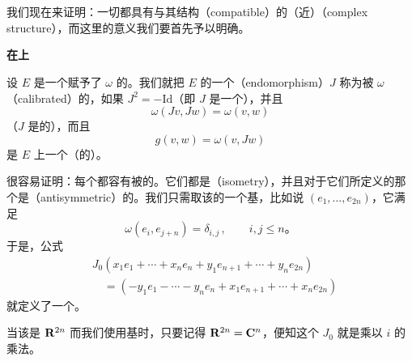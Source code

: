 
\section{\trComplexStructure}
\label{sec:complex-structures}

我们现在来证明：一切\trSymplectic{}\trManifold{}都具有与其\trSymplectic{}结构\textbf{\trCompatible}（compatible）的（近）\textbf{\trComplexStructure}（complex structure），而这里\trCompatible{}的意义我们要首先予以明确。

\textbf{在\trVectorSpace{}上}

设 $E$ 是一个赋予了\trSymplecticForm{} $\omega$ 的\trVectorSpace。我们就把 $E$ 的一个\textbf{\trEndomorphism}（endomorphism）$J$ 称为被 $\omega$ \textbf{\trCalibrated}（calibrated）的\trComplexStructure，如果 $J^2=-\mathrm{Id}$（即 $J$ 是一个\trComplexStructure），并且
\[
\omega(Jv,Jw)=\omega(v,w)
\]
（$J$ 是\trSymplectic{}的），而且
\[
g(v,w)=\omega(v,Jw)
\]
是 $E$ 上一个（\trPositiveDefinite{}的）\trInnerProduct。

很容易证明：每个\trSymplectic{}\trVectorSpace{}都容有被\trCalibrated{}的\trComplexStructure。它们都是\textbf{\trIsometry}（isometry），并且对于它们所定义的那个\trInnerProduct{}是\textbf{\trAntisymmetric}（antisymmetric）的。我们只需取该\trVectorSpace{}的一个\trSymplectic{}基，比如说 $(e_1,\dotsc,e_{2n})$，它满足
\[
\omega(e_i,e_{j+n})=\delta_{i,j}\,,\qquad i,j\le n\text{。}
\]
于是，公式
\[
\begin{aligned}
&J_0(x_1e_1+\dotsb+x_ne_n+y_1e_{n+1}+\dotsb+y_ne_{2n})\\
&\quad=(-y_1e_1-\dotsb-y_ne_n+x_1e_{n+1}+\dotsb+x_ne_{2n})
\end{aligned}
\]
就定义了一个\trComplexStructure。

当该\trVectorSpace{}是 $\mathbf{R}^{2n}$ 而我们使用\trCanonical{}基时，只要记得 $\mathbf{R}^{2n}=\mathbf{C}^n$，便知这个 $J_0$ 就是乘以 $i$ 的乘法。

